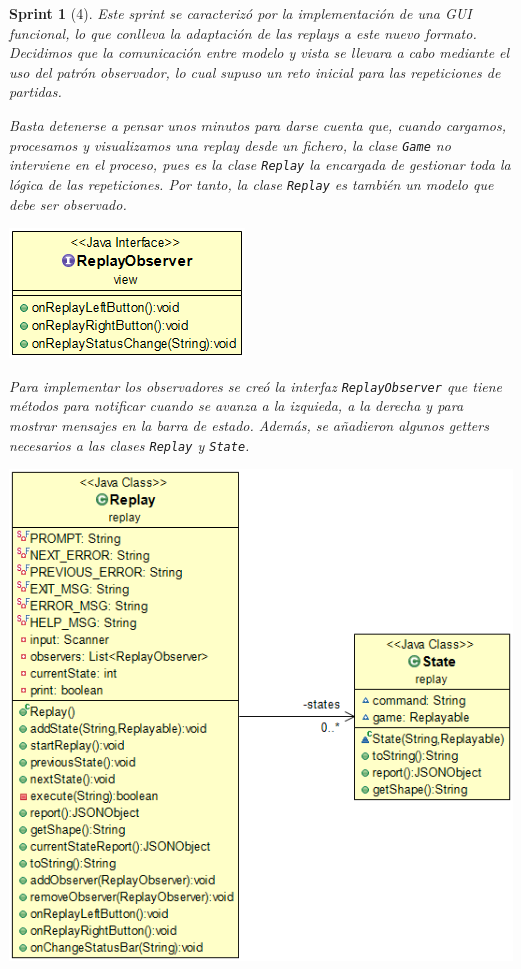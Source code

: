 \documentclass[12pt,a4paper,openright]{book}
\theoremstyle{break}
\newtheorem*{sprint}{Sprint}
\begin{document}
\begin{sprint}[4]

Este sprint se caracterizó por la implementación de una GUI funcional, lo que conlleva la adaptación de las \textit{replays} a este nuevo formato. Decidimos que la comunicación entre modelo y vista se llevara a cabo mediante el uso del patrón observador, lo cual supuso un reto inicial para las repeticiones de partidas.

Basta detenerse a pensar unos minutos para darse cuenta que, cuando cargamos, procesamos y visualizamos una \textit{replay} desde un fichero, la clase \texttt{Game} no interviene en el proceso, pues es la clase \texttt{Replay} la encargada de gestionar toda la lógica de las repeticiones. Por tanto, la clase \texttt{Replay} es también un modelo que debe ser observado.

\begin{center}
\includegraphics[scale=0.5]{rolit-observer-sprint4.png}
\end{center}

Para implementar los observadores se creó la interfaz \texttt{ReplayObserver} que tiene métodos para notificar cuando se avanza a la izquieda, a la derecha y para mostrar mensajes en la barra de estado. Además, se añadieron algunos getters necesarios a las clases \texttt{Replay} y \texttt{State}.

\begin{center}
\includegraphics[scale=0.5]{replay-state-sprint-4.png}
\end{center}

\end{sprint}
\end{document}
